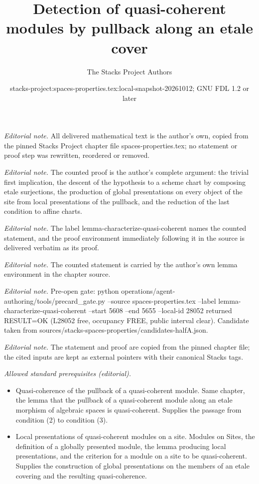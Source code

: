 \documentclass[10pt,a4paper]{amsart}
\title{Detection of quasi-coherent modules by pullback along an etale cover}
\author{The Stacks Project Authors}
\date{stacks-project:spaces-properties.tex:local-snapshot-20261012; GNU FDL 1.2 or later}
\theoremstyle{plain}
\theoremstyle{definition}
\theoremstyle{remark}
\numberwithin{equation}{subsection}
\begin{document}
\maketitle
\noindent\textit{Editorial note.} All delivered mathematical text is the author's own, copied from the pinned Stacks Project chapter file spaces-properties.tex; no statement or proof step was rewritten, reordered or removed.\par\medskip
\noindent\textit{Editorial note.} The counted proof is the author's complete argument: the trivial first implication, the descent of the hypothesis to a scheme chart by composing etale surjections, the production of global presentations on every object of the site from local presentations of the pullback, and the reduction of the last condition to affine charts.\par\medskip
\noindent\textit{Editorial note.} The label lemma-characterize-quasi-coherent names the counted statement, and the proof environment immediately following it in the source is delivered verbatim as its proof.\par\medskip
\noindent\textit{Editorial note.} The counted statement is carried by the author's own lemma environment in the chapter source.\par\medskip
\noindent\textit{Editorial note.} Pre-open gate: python operations/agent-authoring/tools/precard\_gate.py --source spaces-properties.tex --label lemma-characterize-quasi-coherent --start 5608 --end 5655 --local-id 28052 returned RESULT=OK (L28052 free, occupancy FREE, public interval clear). Candidate taken from sources/stacks-spaces-properties/candidates-halfA.json.\par\medskip
\noindent\textit{Editorial note.} The statement and proof are copied from the pinned chapter file; the cited inputs are kept as external pointers with their canonical Stacks tags.\par\medskip
\noindent\textit{Allowed standard prerequisites (editorial).}\begin{itemize}
\item Quasi-coherence of the pullback of a quasi-coherent module. Same chapter, the lemma that the pullback of a quasi-coherent module along an etale morphism of algebraic spaces is quasi-coherent. Supplies the passage from condition (2) to condition (3).
\item Local presentations of quasi-coherent modules on a site. Modules on Sites, the definition of a globally presented module, the lemma producing local presentations, and the criterion for a module on a site to be quasi-coherent. Supplies the construction of global presentations on the members of an etale covering and the resulting quasi-coherence.
\end{itemize}\medskip
\end{document}
